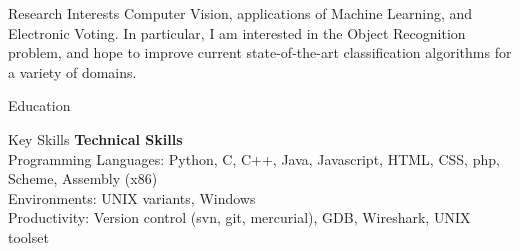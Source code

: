 \documentclass{resume}
\begin{document}
\maketitle
\thispagestyle{empty} %

\begin{component}{Research Interests}
Computer Vision, applications of Machine Learning, and Electronic Voting.
In particular, I am interested in the Object Recognition problem, and
hope to improve current state-of-the-art classification algorithms for
a variety of domains.
\end{component}

\vspace{-0.5em}

\begin{component}{Education}
\end{component}

\begin{component}{Key Skills}
	\textbf{Technical Skills}\\
		Programming Languages: Python, C, C++, Java, Javascript, HTML, CSS, php, Scheme, Assembly (x86)\\
		Environments: UNIX variants, Windows\\
		Productivity: Version control (svn, git, mercurial), GDB, Wireshark, UNIX toolset
\end{component}
\end{document}
